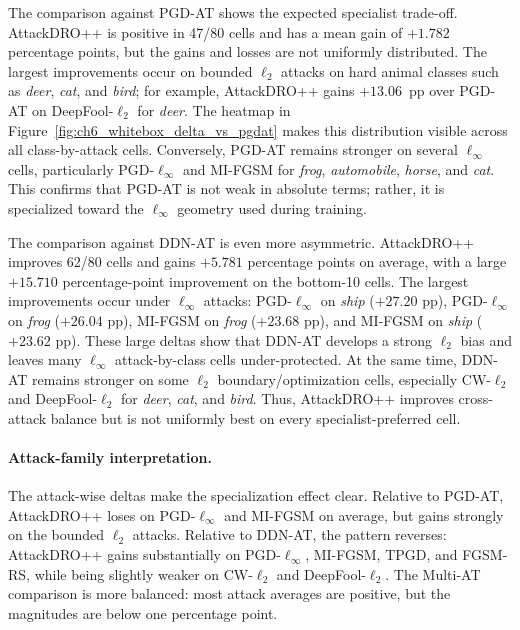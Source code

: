 The comparison against PGD-AT shows the expected specialist trade-off. AttackDRO++ is positive in 47/80 cells and has a mean gain of $+1.782$ percentage points, but the gains and losses are not uniformly distributed. The largest improvements occur on bounded $\ell_2$ attacks on hard animal classes such as \textit{deer}, \textit{cat}, and \textit{bird}; for example, AttackDRO++ gains $+13.06$~pp over PGD-AT on DeepFool-$\ell_2$ for \textit{deer}. The heatmap in Figure~\ref{fig:ch6_whitebox_delta_vs_pgdat} makes this distribution visible across all class-by-attack cells. Conversely, PGD-AT remains stronger on several $\ell_\infty$ cells, particularly PGD-$\ell_\infty$ and MI-FGSM for \textit{frog}, \textit{automobile}, \textit{horse}, and \textit{cat}. This confirms that PGD-AT is not weak in absolute terms; rather, it is specialized toward the $\ell_\infty$ geometry used during training.

The comparison against DDN-AT is even more asymmetric. AttackDRO++ improves 62/80 cells and gains $+5.781$ percentage points on average, with a large $+15.710$ percentage-point improvement on the bottom-10 cells. The largest improvements occur under $\ell_\infty$ attacks: PGD-$\ell_\infty$ on \textit{ship} ($+27.20$ pp), PGD-$\ell_\infty$ on \textit{frog} ($+26.04$ pp), MI-FGSM on \textit{frog} ($+23.68$ pp), and MI-FGSM on \textit{ship} ($+23.62$ pp). These large deltas show that DDN-AT develops a strong $\ell_2$ bias and leaves many $\ell_\infty$ attack-by-class cells under-protected. At the same time, DDN-AT remains stronger on some $\ell_2$ boundary/optimization cells, especially CW-$\ell_2$ and DeepFool-$\ell_2$ for \textit{deer}, \textit{cat}, and \textit{bird}. Thus, AttackDRO++ improves cross-attack balance but is not uniformly best on every specialist-preferred cell.

\paragraph{Attack-family interpretation.}

The attack-wise deltas make the specialization effect clear. Relative to PGD-AT, AttackDRO++ loses on PGD-$\ell_\infty$ and MI-FGSM on average, but gains strongly on the bounded $\ell_2$ attacks. Relative to DDN-AT, the pattern reverses: AttackDRO++ gains substantially on PGD-$\ell_\infty$, MI-FGSM, TPGD, and FGSM-RS, while being slightly weaker on CW-$\ell_2$ and DeepFool-$\ell_2$. 
The Multi-AT comparison is more balanced: most attack averages are positive, but the magnitudes are below one percentage point.

